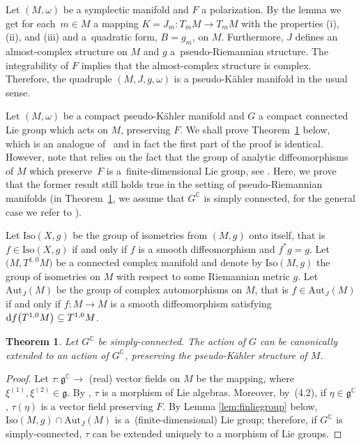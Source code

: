 \documentclass[pdftex]{sigma}
\numberwithin{equation}{section}
\newtheorem{Theorem}{Theorem}[section]
\begin{document}
 	Let $(M, \omega)$ be a symplectic manifold and $F$ a polarization. By the lemma we get for each~${m\in M}$ a mapping $K=J_m \colon T_mM\rightarrow T_mM$ with the properties (i), (ii), and (iii) and a~quadratic form, $B=g_m$, on $M$. Furthermore, $J$ defines an almost-complex structure on $M$ and $g$ a~pseudo-Riemannian structure. The integrability of $F$ implies that the almost-complex structure is complex. Therefore, the quadruple $(M,J,g, \omega)$ is a pseudo-K\"ahler manifold in the usual sense.
 	
 	Let $(M,\omega)$ be a compact pseudo-K\"ahler manifold and $G$ a compact connected Lie group which acts on $M$, preserving $F$. We shall prove Theorem~\ref{thm:4.4} below, which is an analogue of~\cite[Theorem~4.4]{gs} and in fact the first part of the proof is identical. However, note that \cite[Theorem~4.4]{gs} relies on the fact that the group of analytic diffeomorphisms of $M$ which preserve~$F$ is a~finite-dimensional Lie group, see \cite{k}. Here, we prove that the former result still holds true in the setting of pseudo-Riemannian manifolds (in Theorem~\ref{thm:4.4}, we assume that $G^{\mathbb{C}}$ is simply connected, for the general case we refer to \cite[Theorem~4.4]{gs}).
 	
 	Let $\mathrm{Iso}(X, g)$ be the group of isometries from $(M, g)$ onto itself, that is $f \in \mathrm{Iso}(X, g)$ if and only if $f$ is a smooth diffeomorphism and $f^*g=g$. Let $\bigl(M, T^{1,0}M\bigr)$ be a connected complex manifold and denote by $\mathrm{Iso}(M, g)$ the group of isometries on $M$ with respect to some Riemannian metric $g$. Let $\mathrm{Aut}_J(M)$ be the group of complex automorphisms on $M$, that is $f\in\mathrm{Aut}_J(M)$ if and only if $f \colon M\rightarrow M$ is a smooth diffeomorphism satisfying ${\rm d}f\bigl(T^{1,0}M\bigr) \subseteq T^{1,0}M$.
 	
 	\begin{Theorem} \label{thm:4.4} Let $G^{\mathbb{C}}$ be simply-connected. The action of $G$ can be canonically extended to an action of $G^{\mathbb{C}}$, preserving the pseudo-K\"ahler structure of $M$.
 	\end{Theorem}
 	\begin{proof}
 		Let
$\tau \colon \mathfrak{g}^{\mathbb{C}} \rightarrow $ (real) vector fields on $M$
 		be the mapping, 
 		where $\xi^{(1)}, \xi^{(2)}\in \mathfrak{g}$. By \cite[equations~(4.2) and (4.3)]{gs}, $\tau$ is a morphism of Lie algebras. Moreover, by~(4.2), if $\eta \in \mathfrak{g}^{\mathbb{C}}$, $\tau(\eta)$ is a vector field preserving $F$. By Lemma \ref{lem:finliegroup} below, $\mathrm{Iso}(M, g)\cap \mathrm{Aut}_J(M)$ is a~(finite-dimensional) Lie group; therefore, if $G^{\mathbb{C}}$ is simply-connected, $\tau$ can be extended uniquely to a morphism of Lie groups.
 	\end{proof}
\end{document}
